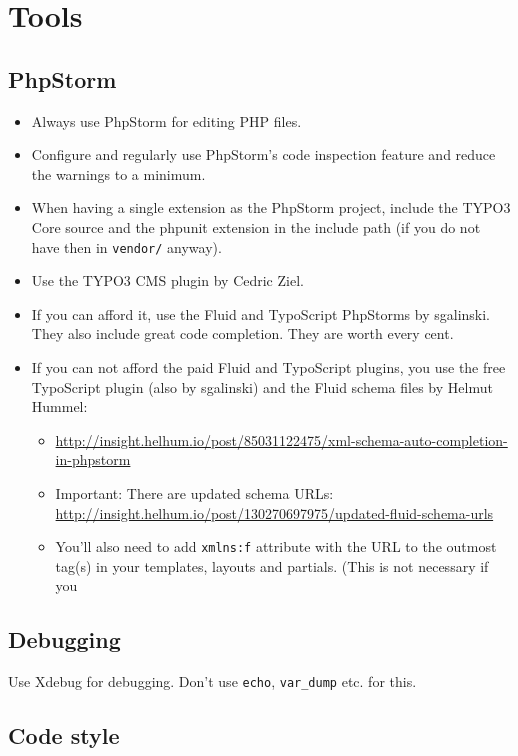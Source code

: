\chapter{Tools}

\section{PhpStorm}

\begin{itemize}
  \item Always use PhpStorm for editing PHP files.
  \item Configure and regularly use PhpStorm’s code inspection feature and reduce the warnings to a minimum.
  \item When having a single extension as the PhpStorm project, include the TYPO3 Core source and the phpunit extension in the include path (if you do not have then in \texttt{vendor/} anyway).
  \item Use the TYPO3 CMS plugin by Cedric Ziel.
  \item If you can afford it, use the Fluid and TypoScript PhpStorms by sgalinski. They also include great code completion. They are worth every cent.
  \item If you can not afford the paid Fluid and TypoScript plugins, you use the free TypoScript plugin (also by sgalinski) and the Fluid schema files by Helmut Hummel:
    \begin{itemize}
      \item \url{http://insight.helhum.io/post/85031122475/xml-schema-auto-completion-in-phpstorm}
      \item Important: There are updated schema URLs:\\\url{http://insight.helhum.io/post/130270697975/updated-fluid-schema-urls}
      \item You’ll also need to add \texttt{xmlns:f} attribute with the URL to the outmost tag(s) in your templates, layouts and partials. (This is not necessary if you
    \end{itemize}
\end{itemize}


\section{Debugging}
Use Xdebug for debugging. Don’t use \texttt{echo}, \texttt{var\_dump}  etc. for this.


\section{Code style}

